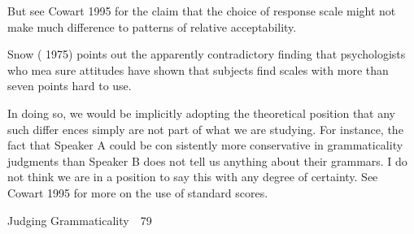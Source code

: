 \setcounter{listWWNumlvleveli}{2}
\begin{listWWNumlvleveli}
\item 
\setcounter{listWWNumlvlevelii}{1}
\begin{listWWNumlvlevelii}
\item 
\setcounter{listWWNumlvleveliii}{0}
\begin{listWWNumlvleveliii}
\item 
\begin{styleStandard}
But see Cowart 1995 for the claim that the choice of response scale might not make much difference to patterns of relative acceptability.
\end{styleStandard}


\item 
\begin{styleStandard}
Snow ( 1975) points out the apparently contradictory finding that psychologists who mea\- sure attitudes have shown that subjects find scales with more than seven points hard to use.
\end{styleStandard}


\end{listWWNumlvleveliii}
\end{listWWNumlvlevelii}
\end{listWWNumlvleveli}
\setcounter{listWWNumxlviileveli}{20}
\begin{listWWNumxlviileveli}
\item 
\begin{styleStandard}
In doing so, we would be implicitly adopting the theoretical position that any such differ\- ences simply are not part of what we are studying. For instance, the fact that Speaker A could be con\- sistently more conservative in grammaticality judgments than Speaker B does not tell us anything about their grammars. I do not think we are in a position to say this with any degree of certainty. See Cowart 1995 for more on the use of standard scores.
\end{styleStandard}


\end{listWWNumxlviileveli}
\clearpage\setcounter{page}{1}\begin{styleStandard}
Judging Grammaticality\ \ 79
\end{styleStandard}


